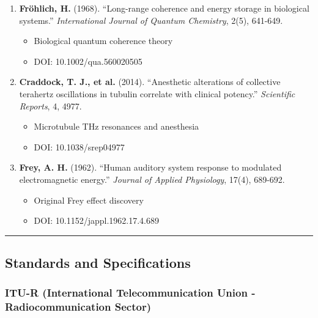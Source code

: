 \begin{enumerate}
\def\labelenumi{\arabic{enumi}.}
\setcounter{enumi}{22}
\tightlist
\item
  \textbf{Fr\"{o}hlich, H.} (1968). ``Long-range
  coherence and energy storage in biological systems.''
  \emph{International Journal of Quantum Chemistry}, 2(5), 641-649.

  \begin{itemize}
  \tightlist
  \item
    Biological quantum coherence theory
  \item
    DOI: 10.1002/qua.560020505
  \end{itemize}
\item
  \textbf{Craddock, T. J., et al.} (2014). ``Anesthetic alterations of
  collective terahertz oscillations in tubulin correlate with clinical
  potency.'' \emph{Scientific Reports}, 4, 4977.

  \begin{itemize}
  \tightlist
  \item
    Microtubule THz resonances and anesthesia
  \item
    DOI: 10.1038/srep04977
  \end{itemize}
\item
  \textbf{Frey, A. H.} (1962). ``Human auditory system response to
  modulated electromagnetic energy.'' \emph{Journal of Applied
  Physiology}, 17(4), 689-692.

  \begin{itemize}
  \tightlist
  \item
    Original Frey effect discovery
  \item
    DOI: 10.1152/jappl.1962.17.4.689
  \end{itemize}
\end{enumerate}

\begin{center}\rule{0.5\linewidth}{0.5pt}\end{center}

\subsection{\texorpdfstring{ Standards and
Specifications}{ Standards and Specifications}}\label{standards-and-specifications}

\subsubsection{ITU-R (International Telecommunication Union -
Radiocommunication
Sector)}\label{itu-r-international-telecommunication-union---radiocommunication-sector}

